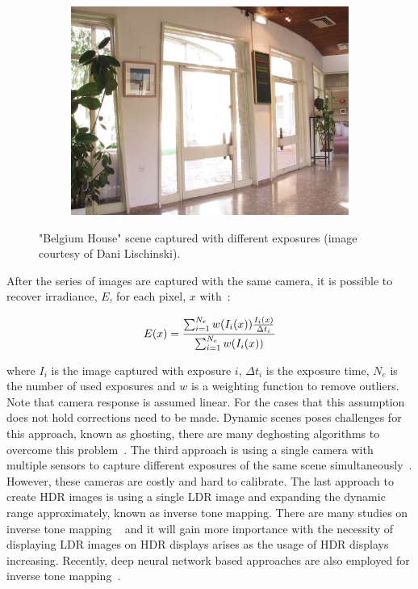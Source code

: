 \begin{figure}
\begin{subfigure}[b]{0.33\textwidth}
    \includegraphics[width=\textwidth]{figures/chapter2/exposure/bh9.jpg}
\end{subfigure}\hfill
\caption{"Belgium House" scene captured with different exposures (image courtesy of Dani Lischinski). }
\label{fig:exposures}
\end{figure}

After the series of images are captured with the same camera, it is possible to recover irradiance, $E$, for each pixel, $x$ with~\cite{banterle2017advanced}:

\begin{equation}
    E(x) = {{\sum^{N_e}_{i=1} w(I_i(x)) {I_i(x) \over \Delta t_i}} \over {\sum^{N_e}_{i=1} w(I_i(x))}} 
\end{equation}

where $I_i$ is the image captured with exposure $i$, $\Delta t_i$ is the exposure time, $N_e$ is the number of used exposures and $w$ is a weighting function to remove outliers. Note that camera response is assumed linear. For the cases that this assumption does not hold corrections need to be made. Dynamic scenes poses challenges for this approach, known as ghosting, there are many deghosting algorithms to overcome this problem~\cite{Tursun2015_deghosting_survey}. The third approach is using a single camera with multiple sensors to capture different exposures of the same scene simultaneously~\cite{tocci2011versatile,mcguire2007optical}. However, these cameras are costly and hard to calibrate. The last approach to create HDR images is using a single LDR image and expanding the dynamic range approximately, known as inverse tone mapping. There are many studies on inverse tone mapping ~\cite{akyuz2007hdr,masia2009evaluation,wang2007high,huo2014physiological} and it will gain more importance with the necessity of displaying LDR images on HDR displays arises as the usage of HDR displays increasing. Recently, deep neural network based approaches are also employed for inverse tone mapping~\cite{eilertsen2017hdr,metzler2020deep}. 


